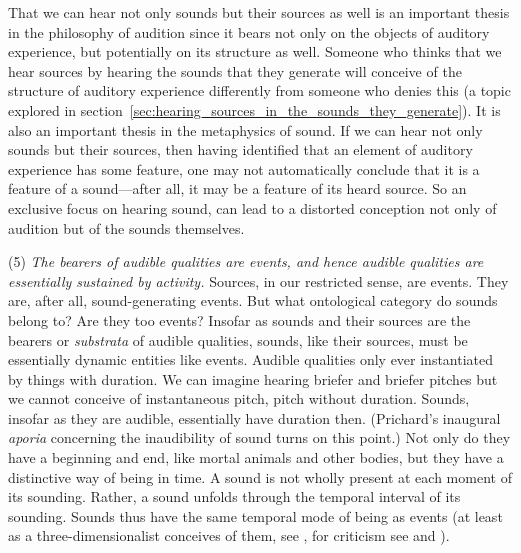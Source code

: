 \documentclass[12pt]{article}
\begin{document}
That we can hear not only sounds but their sources as well is an important thesis in the philosophy of audition since it bears not only on the objects of auditory experience, but potentially on its structure as well. Someone who thinks that we hear sources by hearing the sounds that they generate will conceive of the structure of auditory experience differently from someone who denies this (a topic explored in section~\ref{sec:hearing_sources_in_the_sounds_they_generate}). It is also an important thesis in the metaphysics of sound. If we can hear not only sounds but their sources, then having identified that an element of auditory experience has some feature, one may not automatically conclude that it is a feature of a sound---after all, it may be a feature of its heard source. So an exclusive focus on hearing sound, can lead to a distorted conception not only of audition but of the sounds themselves.

(5) \emph{The bearers of audible qualities are events, and hence audible qualities are essentially sustained by activity.} Sources, in our restricted sense, are events. They are, after all, sound-generating events. But what ontological category do sounds belong to? Are they too events? Insofar as sounds and their sources are the bearers or \emph{substrata} of audible qualities, sounds, like their sources, must be essentially dynamic entities like events. Audible qualities only ever instantiated by things with duration. We can imagine hearing briefer and briefer pitches but we cannot conceive of instantaneous pitch, pitch without duration. Sounds, insofar as they are audible, essentially have duration then. (Prichard's \citeyear{Prichard:1950ly} inaugural \emph{aporia} concerning the inaudibility of sound turns on this point.) Not only do they have a beginning and end, like mortal animals and other bodies, but they have a distinctive way of being in time. A sound is not wholly present at each moment of its sounding. Rather, a sound unfolds through the temporal interval of its sounding. Sounds thus have the same temporal mode of being as events (at least as a three-dimensionalist conceives of them, see \citealt{Fine:2006fk}, for criticism see \citealt{Sider:1997fk} and \citealt{Hawthorne:2008uq}). 
\end{document}
